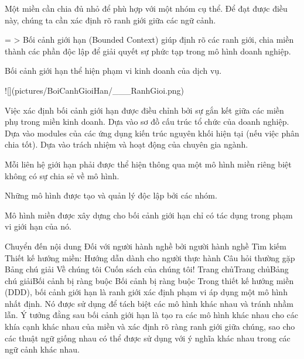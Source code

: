 
Một miền cần chia đủ nhỏ để phù hợp với một nhóm cụ thể. Để đạt được điều này, chúng ta cần xác định rõ ranh giới giữa các ngữ cảnh.

= > Bối cảnh giới hạn (Bounded Context) giúp định rõ các ranh giới, chia miền thành các phần độc lập để giải quyết sự phức tạp trong mô hình doanh nghiệp.

Bối cảnh giới hạn thể hiện phạm vi kinh doanh của dịch vụ.

![](pictures/BoiCanhGioiHan/___RanhGioi.png)


Việc xác định bối cảnh giới hạn được điều chỉnh bởi sự gắn kết giữa các miền phụ trong miền kinh doanh.
Dựa vào sơ đồ cấu trúc tổ chức của doanh nghiệp.
Dựa vào modules của các ứng dụng kiến trúc nguyên khối hiện tại (nếu việc phân chia tốt).
Dựa vào trách nhiệm và hoạt động của chuyên gia ngành.


Mỗi liên hệ giới hạn phải được thể hiện thông qua một mô hình miền riêng biệt không có sự chia sẻ về mô hình.


Những mô hình được tạo và quản lý độc lập bởi các nhóm.


Mô hình miền được xây dựng cho bối cảnh giới hạn chỉ có tác dụng trong phạm vi giới hạn của nó.





Chuyển đến nội dung
Đối với người hành nghề bởi người hành nghề
Tìm kiếm
Thiết kế hướng miền: Hướng dẫn dành cho người thực hành
Câu hỏi thường gặp
Bảng chú giải
Về chúng tôi
Cuốn sách của chúng tôi!
Trang chủTrang chủBảng chú giảiBối cảnh bị ràng buộc
Bối cảnh bị ràng buộc
Trong thiết kế hướng miền (DDD), bối cảnh giới hạn là ranh giới xác định phạm vi áp dụng một mô hình nhất định. Nó được sử dụng để tách biệt các mô hình khác nhau và tránh nhầm lẫn. Ý tưởng đằng sau bối cảnh giới hạn là tạo ra các mô hình khác nhau cho các khía cạnh khác nhau của miền và xác định rõ ràng ranh giới giữa chúng, sao cho các thuật ngữ giống nhau có thể được sử dụng với ý nghĩa khác nhau trong các ngữ cảnh khác nhau.

